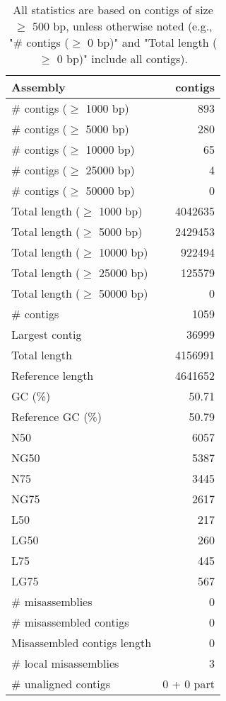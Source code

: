 \documentclass[12pt,a4paper]{article}
\begin{document}
\begin{table}[ht]
\begin{center}
\caption{All statistics are based on contigs of size $\geq$ 500 bp, unless otherwise noted (e.g., "\# contigs ($\geq$ 0 bp)" and "Total length ($\geq$ 0 bp)" include all contigs).}
\begin{tabular}{|l*{1}{|r}|}
\hline
Assembly & contigs \\ \hline
\# contigs ($\geq$ 1000 bp) & 893 \\ \hline
\# contigs ($\geq$ 5000 bp) & 280 \\ \hline
\# contigs ($\geq$ 10000 bp) & 65 \\ \hline
\# contigs ($\geq$ 25000 bp) & 4 \\ \hline
\# contigs ($\geq$ 50000 bp) & 0 \\ \hline
Total length ($\geq$ 1000 bp) & 4042635 \\ \hline
Total length ($\geq$ 5000 bp) & 2429453 \\ \hline
Total length ($\geq$ 10000 bp) & 922494 \\ \hline
Total length ($\geq$ 25000 bp) & 125579 \\ \hline
Total length ($\geq$ 50000 bp) & 0 \\ \hline
\# contigs & 1059 \\ \hline
Largest contig & 36999 \\ \hline
Total length & 4156991 \\ \hline
Reference length & 4641652 \\ \hline
GC (\%) & 50.71 \\ \hline
Reference GC (\%) & 50.79 \\ \hline
N50 & 6057 \\ \hline
NG50 & 5387 \\ \hline
N75 & 3445 \\ \hline
NG75 & 2617 \\ \hline
L50 & 217 \\ \hline
LG50 & 260 \\ \hline
L75 & 445 \\ \hline
LG75 & 567 \\ \hline
\# misassemblies & 0 \\ \hline
\# misassembled contigs & 0 \\ \hline
Misassembled contigs length & 0 \\ \hline
\# local misassemblies & 3 \\ \hline
\# unaligned contigs & 0 + 0 part \\ \hline

\end{tabular}
\end{center}
\end{table}
\end{document}
